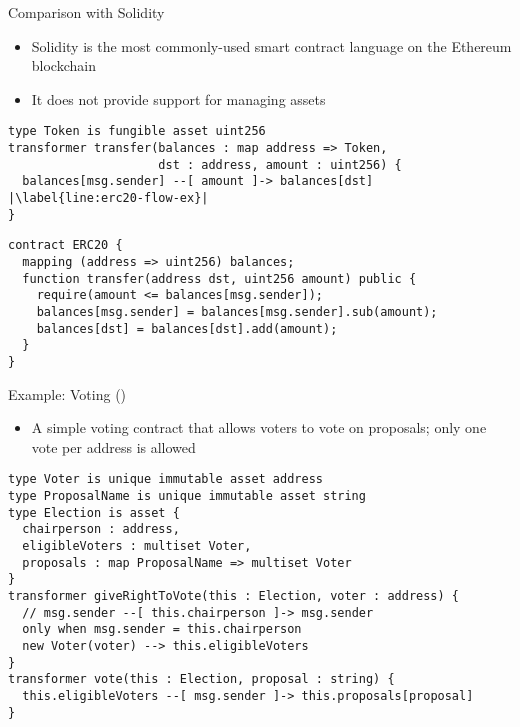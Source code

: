\documentclass[leqno,presentation,usenames,dvipsnames]{beamer}
\begin{document}
\begin{frame}[fragile]{Comparison with Solidity}
    \begin{itemize}
        \item Solidity is the most commonly-used smart contract language on the Ethereum blockchain
        \item It does not provide support for managing assets
    \end{itemize}

\begin{lstlisting}[language=flow, xleftmargin=-0.5em, basicstyle=\footnotesize\ttfamily]
type Token is fungible asset uint256
transformer transfer(balances : map address => Token,
                     dst : address, amount : uint256) {
  balances[msg.sender] --[ amount ]-> balances[dst] |\label{line:erc20-flow-ex}|
}
\end{lstlisting}
\begin{lstlisting}[language=Solidity, xleftmargin=-0.5em, basicstyle=\scriptsize\ttfamily]
contract ERC20 {
  mapping (address => uint256) balances;
  function transfer(address dst, uint256 amount) public {
    require(amount <= balances[msg.sender]);
    balances[msg.sender] = balances[msg.sender].sub(amount);
    balances[dst] = balances[dst].add(amount);
  }
}
\end{lstlisting}
\end{frame}

\begin{frame}[fragile]{Example: Voting (\langName)}
    \begin{itemize}
        \item A simple voting contract that allows voters to vote on proposals; only one vote per address is allowed
    \end{itemize}
\begin{lstlisting}[language=flow, xleftmargin=-0.2em, basicstyle=\scriptsize\ttfamily]
type Voter is unique immutable asset address
type ProposalName is unique immutable asset string
type Election is asset {
  chairperson : address,
  eligibleVoters : multiset Voter,
  proposals : map ProposalName => multiset Voter
}
transformer giveRightToVote(this : Election, voter : address) {
  // msg.sender --[ this.chairperson ]-> msg.sender
  only when msg.sender = this.chairperson
  new Voter(voter) --> this.eligibleVoters
}
transformer vote(this : Election, proposal : string) {
  this.eligibleVoters --[ msg.sender ]-> this.proposals[proposal]
}
\end{lstlisting}
\end{frame}
\end{document}
